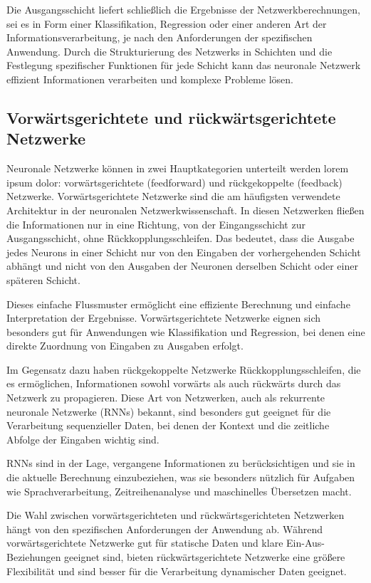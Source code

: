 Die Ausgangsschicht liefert schließlich die Ergebnisse der Netzwerkberechnungen, sei es in Form einer Klassifikation, Regression oder einer anderen Art der Informationsverarbeitung, je nach den Anforderungen der spezifischen Anwendung. Durch die Strukturierung des Netzwerks in Schichten und die Festlegung spezifischer Funktionen für jede Schicht kann das neuronale Netzwerk effizient Informationen verarbeiten und komplexe Probleme lösen.

\subsection{Vorwärtsgerichtete und rückwärtsgerichtete Netzwerke}
\label{sec:Grundlagen_vorwarts_Netzwerke}
Neuronale Netzwerke können in zwei Hauptkategorien unterteilt werden lorem ipsum dolor: vorwärtsgerichtete (feedforward) und rückgekoppelte (feedback) Netzwerke.
Vorwärtsgerichtete Netzwerke sind die am häufigsten verwendete Architektur in der neuronalen Netzwerkwissenschaft. In diesen Netzwerken fließen die Informationen nur in eine Richtung, von der Eingangsschicht zur Ausgangsschicht, ohne Rückkopplungsschleifen. Das bedeutet, dass die Ausgabe jedes Neurons in einer Schicht nur von den Eingaben der vorhergehenden Schicht abhängt und nicht von den Ausgaben der Neuronen derselben Schicht oder einer späteren Schicht.

Dieses einfache Flussmuster ermöglicht eine effiziente Berechnung und einfache Interpretation der Ergebnisse. Vorwärtsgerichtete Netzwerke eignen sich besonders gut für Anwendungen wie Klassifikation und Regression, bei denen eine direkte Zuordnung von Eingaben zu Ausgaben erfolgt.

Im Gegensatz dazu haben rückgekoppelte Netzwerke Rückkopplungsschleifen, die es ermöglichen, Informationen sowohl vorwärts als auch rückwärts durch das Netzwerk zu propagieren. Diese Art von Netzwerken, auch als rekurrente neuronale Netzwerke (RNNs) bekannt, sind besonders gut geeignet für die Verarbeitung sequenzieller Daten, bei denen der Kontext und die zeitliche Abfolge der Eingaben wichtig sind.

RNNs sind in der Lage, vergangene Informationen zu berücksichtigen und sie in die aktuelle Berechnung einzubeziehen, was sie besonders nützlich für Aufgaben wie Sprachverarbeitung, Zeitreihenanalyse und maschinelles Übersetzen macht.

Die Wahl zwischen vorwärtsgerichteten und rückwärtsgerichteten Netzwerken hängt von den spezifischen Anforderungen der Anwendung ab. Während vorwärtsgerichtete Netzwerke gut für statische Daten und klare Ein-Aus-Beziehungen geeignet sind, bieten rückwärtsgerichtete Netzwerke eine größere Flexibilität und sind besser für die Verarbeitung dynamischer Daten geeignet.

